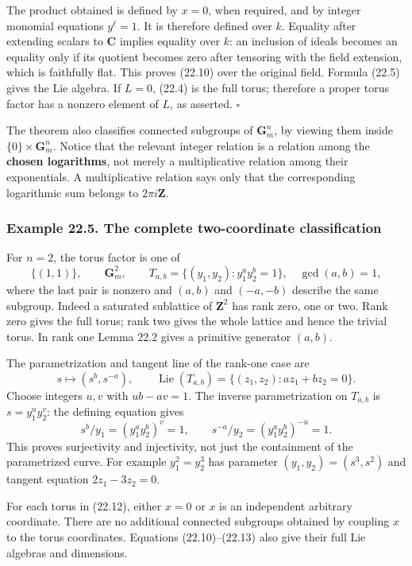 \documentclass[
  11pt,
  a4paper,
]{article}
\begin{document}
The product obtained is defined by \(x=0\), when required, and by
integer monomial equations \(y^\ell=1\). It is therefore defined over
\(k\). Equality after extending scalars to \(\mathbf C\) implies
equality over \(k\): an inclusion of ideals becomes an equality only if
its quotient becomes zero after tensoring with the field extension,
which is faithfully flat. This proves (22.10) over the original field.
Formula (22.5) gives the Lie algebra. If \(L=0\), (22.4) is the full
torus; therefore a proper torus factor has a nonzero element of \(L\),
as asserted. \(\square\)

The theorem also classifies connected subgroups of \(\mathbf G_m^n\), by
viewing them inside \(\{0\}\times\mathbf G_m^n\). Notice that the
relevant integer relation is a relation among the \textbf{chosen
logarithms}, not merely a multiplicative relation among their
exponentials. A multiplicative relation says only that the corresponding
logarithmic sum belongs to \(2\pi i\mathbf Z\).

\subsubsection{Example 22.5. The complete two-coordinate
classification}\label{example-22.5.-the-complete-two-coordinate-classification}

For \(n=2\), the torus factor is one of \[
 \{(1,1)\},\qquad\mathbf G_m^2,\qquad
 T_{a,b}=\{(y_1,y_2):y_1^a y_2^b=1\},
 \quad\gcd(a,b)=1,
 \tag{22.12}
\] where the last pair is nonzero and \((a,b)\) and \((-a,-b)\) describe
the same subgroup. Indeed a saturated sublattice of \(\mathbf Z^2\) has
rank zero, one or two. Rank zero gives the full torus; rank two gives
the whole lattice and hence the trivial torus. In rank one Lemma 22.2
gives a primitive generator \((a,b)\).

The parametrization and tangent line of the rank-one case are \[
 s\longmapsto(s^b,s^{-a}),\qquad
 \operatorname{Lie}(T_{a,b})=\{(z_1,z_2):az_1+bz_2=0\}.
 \tag{22.13}
\] Choose integers \(u,v\) with \(ub-av=1\). The inverse parametrization
on \(T_{a,b}\) is \(s=y_1^u y_2^v\): the defining equation gives \[
 s^b/y_1=(y_1^a y_2^b)^v=1,
 \qquad
 s^{-a}/y_2=(y_1^a y_2^b)^{-u}=1.
\] This proves surjectivity and injectivity, not just the containment of
the parametrized curve. For example \(y_1^2=y_2^3\) has parameter
\((y_1,y_2)=(s^3,s^2)\) and tangent equation \(2z_1-3z_2=0\).

For each torus in (22.12), either \(x=0\) or \(x\) is an independent
arbitrary coordinate. There are no additional connected subgroups
obtained by coupling \(x\) to the torus coordinates. Equations
(22.10)--(22.13) also give their full Lie algebras and dimensions.
\end{document}
